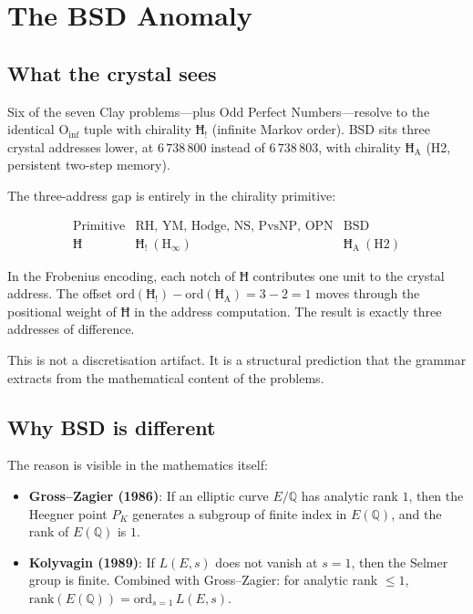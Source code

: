 \documentclass[11pt,a4paper]{article}
\theoremstyle{definition}
\begin{document}
\section{The BSD Anomaly}

\subsection{What the crystal sees}

Six of the seven Clay problems---plus Odd Perfect Numbers---resolve to the
identical $\text{O}_{\text{inf}}$ tuple with chirality $\text{Ħ}_{\text{!}}$
(infinite Markov order). BSD sits three crystal addresses lower, at
$6\,738\,800$ instead of $6\,738\,803$, with chirality $\text{Ħ}_{\text{A}}$
(H2, persistent two-step memory).

The three-address gap is entirely in the chirality primitive:

\[
\begin{array}{c|c|c}
\text{Primitive} & \text{RH, YM, Hodge, NS, PvsNP, OPN} & \text{BSD} \\ \hline
\text{Ħ} & \text{Ħ}_{\text{!}}\ (\text{H}_\infty) & \text{Ħ}_{\text{A}}\ (\text{H2})
\end{array}
\]

In the Frobenius encoding, each notch of $\text{Ħ}$ contributes one unit to the
crystal address. The offset $\text{ord}(\text{Ħ}_{\text{!}}) - \text{ord}(\text{Ħ}_{\text{A}})
= 3 - 2 = 1$ moves through the positional weight of $\text{Ħ}$ in the address
computation. The result is exactly three addresses of difference.

This is not a discretisation artifact. It is a structural prediction that the
grammar extracts from the mathematical content of the problems.

\subsection{Why BSD is different}

The reason is visible in the mathematics itself:

\begin{itemize}
  \item {\bf Gross--Zagier (1986)}: If an elliptic curve $E/\mathbb{Q}$ has
        analytic rank $1$, then the Heegner point $P_K$ generates a subgroup of
        finite index in $E(\mathbb{Q})$, and the rank of $E(\mathbb{Q})$ is $1$.
  \item {\bf Kolyvagin (1989)}: If $L(E, s)$ does not vanish at $s = 1$, then
        the Selmer group is finite. Combined with Gross--Zagier: for analytic
        rank $\le 1$, $\text{rank}(E(\mathbb{Q})) = \text{ord}_{s=1}\, L(E, s)$.
\end{itemize}
\end{document}
